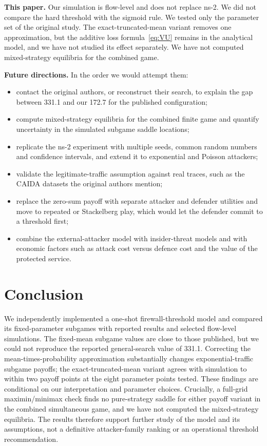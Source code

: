 \documentclass[conference]{IEEEtran}
\begin{document}
\textbf{This paper.} Our simulation is flow-level and does not replace ns-2. We did not compare the hard threshold with the sigmoid rule. We tested only the parameter set of the original study. The exact-truncated-mean variant removes one approximation, but the additive loss formula~\eqref{eq:VU} remains in the analytical model, and we have not studied its effect separately. We have not computed mixed-strategy equilibria for the combined game.

\textbf{Future directions.} In the order we would attempt them:
\begin{itemize}
\item contact the original authors, or reconstruct their search, to explain the gap between 331.1 and our 172.7 for the published configuration;
\item compute mixed-strategy equilibria for the combined finite game and quantify uncertainty in the simulated subgame saddle locations;
\item replicate the ns-2 experiment with multiple seeds, common random numbers and confidence intervals, and extend it to exponential and Poisson attackers;
\item validate the legitimate-traffic assumption against real traces, such as the CAIDA datasets the original authors mention;
\item replace the zero-sum payoff with separate attacker and defender utilities and move to repeated or Stackelberg play, which would let the defender commit to a threshold first;
\item combine the external-attacker model with insider-threat models and with economic factors such as attack cost versus defence cost and the value of the protected service.
\end{itemize}

\section{Conclusion}\label{sec:concl}
We independently implemented a one-shot firewall-threshold model and compared its fixed-parameter subgames with reported results and selected flow-level simulations. The fixed-mean subgame values are close to those published, but we could not reproduce the reported general-search value of 331.1. Correcting the mean-times-probability approximation substantially changes exponential-traffic subgame payoffs; the exact-truncated-mean variant agrees with simulation to within two payoff points at the eight parameter points tested. These findings are conditional on our interpretation and parameter choices. Crucially, a full-grid maximin/minimax check finds no pure-strategy saddle for either payoff variant in the combined simultaneous game, and we have not computed the mixed-strategy equilibria. The results therefore support further study of the model and its assumptions, not a definitive attacker-family ranking or an operational threshold recommendation.
\end{document}
